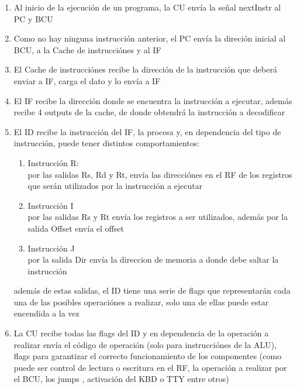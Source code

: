 \documentclass{article}
\begin{document}
        \begin{enumerate}
            \item Al inicio de la ejecuci\'on de un programa, la CU env\'ia la se\~nal nextInstr al PC y BCU
            \item Como no hay ninguna instrucci\'on anterior, el PC env\'ia la direci\'on inicial al BCU, a la Cache de instrucci\'ones y al IF
            \item El Cache de instrucci\'ones recibe la direcci\'on de la instrucci\'on que deber\'a enviar a IF, carga el dato y lo env\'ia a IF 
            \item El IF recibe la direcci\'on donde se encuentra la instrucci\'on a ejecutar, adem\'as recibe 4 outputs de la cache, de donde obtendr\'a la instrucci\'on a decodificar
            \item El ID recibe la instrucci\'on del IF, la procesa y, en dependencia del tipo de instrucci\'on, puede tener distintos comportamientos:
            \begin{enumerate}
                \item Instrucci\'on R:\\
                por las salidas Rs, Rd y Rt, env\'ia las direcci\'ones en el RF de los registros que ser\'an utilizados por la instrucci\'on a ejecutar
                \item Instrucci\'on I\\
                por las salidas Rs y Rt env\'ia los registros a ser utilizados, adem\'as por la salida Offset env\'ia el offset
                \item Instrucci\'on J\\
                por la salida Dir env\'ia la direccion de memoria a donde debe saltar la instrucci\'on
                
            \end{enumerate}
                adem\'as de estas salidas, el ID tiene una serie de flags que representar\'an cada una de las posibles operaci\'ones a realizar,
                solo una de ellas puede estar encendida a la vez 
            \item La CU recibe todas las flags del ID y en dependencia de la operaci\'on a realizar env\'ia el c\'odigo de operaci\'on (solo para instrucci\'ones de la ALU),
            flags para garantizar el correcto funcionamiento de los componentes (como puede ser control de lectura o escritura en el RF, la operaci\'on a realizar por el BCU, los jumps
            , activaci\'on del KBD o TTY entre otros)


\end{enumerate}
\end{document}
